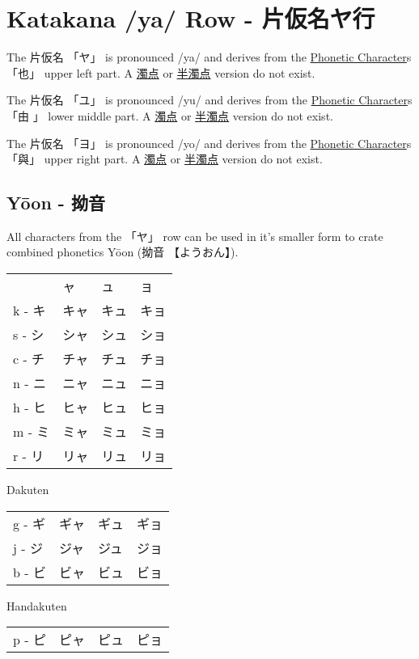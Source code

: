 \section{Katakana /ya/ Row - 片仮名ヤ行}\label{sec:KatakanaYaRow}


 The  片仮名 {「ヤ」} is pronounced  /ya/ and  derives from the
\hyperref[sec:PhoneticCharacter]{Phonetic Character}s {「也」} upper left part.
A \hyperref[sec:Dakuten]{濁点} or \hyperref[sec:Handakuten]{半濁点} version do
not exist.

 The  片仮名 {「ユ」} is pronounced  /yu/ and  derives from the
\hyperref[sec:PhoneticCharacter]{Phonetic Character}s {「由 」} lower middle
part.  A \hyperref[sec:Dakuten]{濁点} or \hyperref[sec:Handakuten]{半濁点}
version do not exist.

 The  片仮名 {「ヨ」} is pronounced  /yo/ and  derives from the
\hyperref[sec:PhoneticCharacter]{Phonetic Character}s {「與」} upper right
part.  A \hyperref[sec:Dakuten]{濁点} or \hyperref[sec:Handakuten]{半濁点}
version do not exist.

\newpage
\subsection{Yōon - 拗音}

All characters from the {「ヤ」} row can be used in it's smaller form to crate
combined phonetics Yōon ({拗音} {【ようおん】}). 

\begin{center} \Large
\begin{tabular}{llll}
      &ャ  &ュ  &ョ  \\
k - キ&キャ&キュ&キョ\\
s - シ&シャ&シュ&ショ\\
c - チ&チャ&チュ&チョ\\
n - ニ&ニャ&ニュ&ニョ\\
h - ヒ&ヒャ&ヒュ&ヒョ\\
m - ミ&ミャ&ミュ&ミョ\\
r - リ&リャ&リュ&リョ\\
\end{tabular}

Dakuten

\begin{tabular}{llll}
g - ギ&ギャ&ギュ&ギョ\\
j - ジ&ジャ&ジュ&ジョ\\
b - ビ&ビャ&ビュ&ビョ\\
\end{tabular}

Handakuten

\begin{tabular}{llll}
p - ピ&ピャ&ピュ&ピョ\\
\end{tabular}
\end{center}


